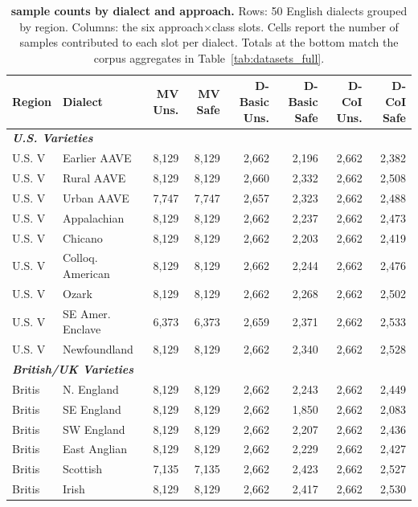 \begin{table}[t]
\centering
\scriptsize
\setlength{\tabcolsep}{3pt}
\caption{\textbf{\dataset{} sample counts by dialect and approach.} Rows: 50 English dialects grouped by region. Columns: the six approach$\times$class slots. Cells report the number of samples contributed to each slot per dialect. Totals at the bottom match the corpus aggregates in Table~\ref{tab:datasets_full}.}
\label{tab:generation_by_dialect}
\begin{tabular}{llrrrrrr}
\toprule
\textbf{Region} & \textbf{Dialect} & \textbf{MV Uns.} & \textbf{MV Safe} & \textbf{D-Basic Uns.} & \textbf{D-Basic Safe} & \textbf{D-CoI Uns.} & \textbf{D-CoI Safe} \\
\midrule
\multicolumn{8}{l}{\textit{\textbf{U.S. Varieties}}} \\
U.S. V & Earlier AAVE & 8,129 & 8,129 & 2,662 & 2,196 & 2,662 & 2,382 \\
U.S. V & Rural AAVE & 8,129 & 8,129 & 2,660 & 2,332 & 2,662 & 2,508 \\
U.S. V & Urban AAVE & 7,747 & 7,747 & 2,657 & 2,323 & 2,662 & 2,488 \\
U.S. V & Appalachian & 8,129 & 8,129 & 2,662 & 2,237 & 2,662 & 2,473 \\
U.S. V & Chicano & 8,129 & 8,129 & 2,662 & 2,203 & 2,662 & 2,419 \\
U.S. V & Colloq. American & 8,129 & 8,129 & 2,662 & 2,244 & 2,662 & 2,476 \\
U.S. V & Ozark & 8,129 & 8,129 & 2,662 & 2,268 & 2,662 & 2,502 \\
U.S. V & SE Amer. Enclave & 6,373 & 6,373 & 2,659 & 2,371 & 2,662 & 2,533 \\
U.S. V & Newfoundland & 8,129 & 8,129 & 2,662 & 2,340 & 2,662 & 2,528 \\
\midrule
\multicolumn{8}{l}{\textit{\textbf{British/UK Varieties}}} \\
Britis & N. England & 8,129 & 8,129 & 2,662 & 2,243 & 2,662 & 2,449 \\
Britis & SE England & 8,129 & 8,129 & 2,662 & 1,850 & 2,662 & 2,083 \\
Britis & SW England & 8,129 & 8,129 & 2,662 & 2,207 & 2,662 & 2,436 \\
Britis & East Anglian & 8,129 & 8,129 & 2,662 & 2,229 & 2,662 & 2,427 \\
Britis & Scottish & 7,135 & 7,135 & 2,662 & 2,423 & 2,662 & 2,527 \\
Britis & Irish & 8,129 & 8,129 & 2,662 & 2,417 & 2,662 & 2,530 \\

\end{tabular}
\end{table}
